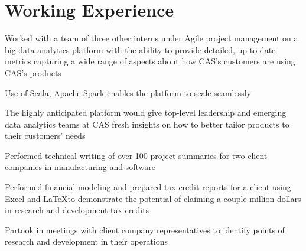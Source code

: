 \documentclass[]{deedy-resume-openfont}
\begin{document}
\hfill
\begin{minipage}[t]{0.6\textwidth}


\section{Working Experience}
\vspace{\topsep} %
\begin{tightemize}
\item Worked with a team of three other interns under Agile project management on a big data analytics platform with the ability to provide detailed, up-to-date metrics capturing a wide range of aspects about how CAS's customers are using CAS's products
\item Use of Scala, Apache Spark enables the platform to scale seamlessly
\item The highly anticipated platform would give top-level leadership and emerging data analytics teams at CAS fresh insights on how to better tailor products to their customers' needs
\end{tightemize}

\begin{tightemize}
\item Performed technical writing of over 100 project summaries for two client companies in manufacturing and software
\item Performed financial modeling and prepared tax credit reports for a client using Excel and \LaTeX to demonstrate the potential of claiming a couple million dollars in research and development tax credits
\item Partook in meetings with client company representatives to identify points of research and development in their operations
\end{tightemize}



\end{minipage}
\end{document}
